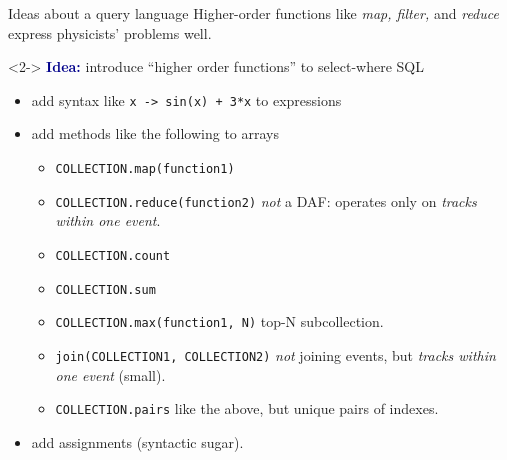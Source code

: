 \documentclass{beamer}
\begin{document}
\begin{frame}{Ideas about a query language}
\vspace{0.25 cm}
Higher-order functions like {\it map, filter,} and {\it reduce} express physicists' problems well.

\vspace{0.25 cm}
\begin{uncoverenv}<2->
\textcolor{darkblue}{\bf Idea:} introduce ``higher order functions'' to select-where SQL
\begin{itemize}
\item add syntax like {\tt x -> sin(x) + 3*x} to expressions
\item add methods like the following to arrays
\begin{itemize}
\item {\tt \scriptsize COLLECTION.map(function1)}
\item {\tt \scriptsize COLLECTION.reduce(function2)} {\it not} a DAF: operates only on {\it tracks within one event}.
\item {\tt \scriptsize COLLECTION.count}
\item {\tt \scriptsize COLLECTION.sum}
\item {\tt \scriptsize COLLECTION.max(function1, N)} top-N subcollection.
\item {\tt \scriptsize join(COLLECTION1, COLLECTION2)} {\it not} joining events, but {\it tracks within one event} (small).
\item {\tt \scriptsize COLLECTION.pairs} like the above, but unique pairs of indexes.
\end{itemize}
\item add assignments (syntactic sugar).
\end{itemize}
\end{uncoverenv}
\end{frame}
\end{document}
